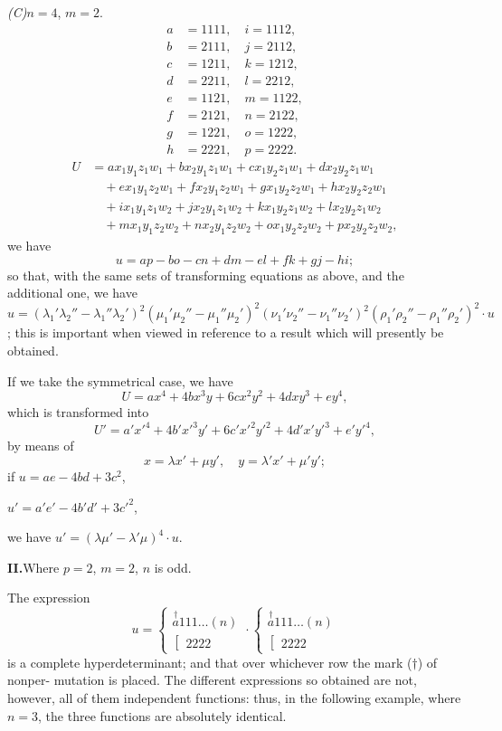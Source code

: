 \documentclass[11pt,a4paper]{book}
\begin{document}
\newpage
\textit{(C)}\quad $n=4$, $m=2$.
\begin{align*}
a &= 1111, \quad i = 1112, \\
b &= 2111, \quad j = 2112, \\
c &= 1211, \quad k = 1212, \\
d &= 2211, \quad l = 2212, \\
e &= 1121, \quad m = 1122, \\
f &= 2121, \quad n = 2122, \\
g &= 1221, \quad o = 1222, \\
h &= 2221, \quad p = 2222.
\end{align*}
\begin{align*}
U &= ax_1y_1z_1w_1 + bx_2y_1z_1w_1 + cx_1y_2z_1w_1 + dx_2y_2z_1w_1 \\
&\quad + ex_1y_1z_2w_1 + fx_2y_1z_2w_1 + gx_1y_2z_2w_1 + hx_2y_2z_2w_1 \\
&\quad + ix_1y_1z_1w_2 + jx_2y_1z_1w_2 + kx_1y_2z_1w_2 + lx_2y_2z_1w_2 \\
&\quad + mx_1y_1z_2w_2 + nx_2y_1z_2w_2 + ox_1y_2z_2w_2 + px_2y_2z_2w_2,
\end{align*}
we have
\[
u = ap - bo - cn + dm - el + fk + gj - hi;
\]
so that, with the same sets of transforming equations as above, and the additional one,
we have $u = (\lambda_1'\lambda_2'' - \lambda_1''\lambda_2')^2 (\mu_1'\mu_2'' - \mu_1''\mu_2')^2 (\nu_1'\nu_2'' - \nu_1''\nu_2')^2 (\rho_1'\rho_2'' - \rho_1''\rho_2')^2 \cdot u$;
this is important when viewed in reference to a result which will presently be obtained.

If we take the symmetrical case, we have
\[
U = ax^4 + 4b x^3y + 6c x^2y^2 + 4d xy^3 + ey^4,
\]
which is transformed into
\[
U' = a'x'^4 + 4b' x'^3y' + 6c' x'^2y'^2 + 4d' x'y'^3 + e'y'^4,
\]
by means of
\[
x = \lambda x' + \mu y', \quad y = \lambda' x' + \mu' y';
\]
if $u = ae - 4bd + 3c^2$,

$u' = a'e' - 4b'd' + 3c'^2$,

we have $u' = (\lambda\mu' - \lambda'\mu)^4 \cdot u$.

\newpage
\textbf{II.}\quad Where $p=2$, $m=2$, $n$ is odd.

The expression
\[
u =
\left\{\begin{array}{c}
\stackrel{\dagger}{a} 111\ldots(n) \\
\left[\begin{array}{c}
2222
\end{array}\right.
\end{array}\right.
\cdot
\left\{\begin{array}{c}
\stackrel{\dagger}{a} 111\ldots(n) \\
\left[\begin{array}{c}
2222
\end{array}\right.
\end{array}\right.
\]
is a complete hyperdeterminant; and that over whichever row the mark ($\dagger$) of nonper-
mutation is placed. The different expressions so obtained are not, however, all of them
independent functions: thus, in the following example, where $n=3$, the three functions
are absolutely identical.
\end{document}

